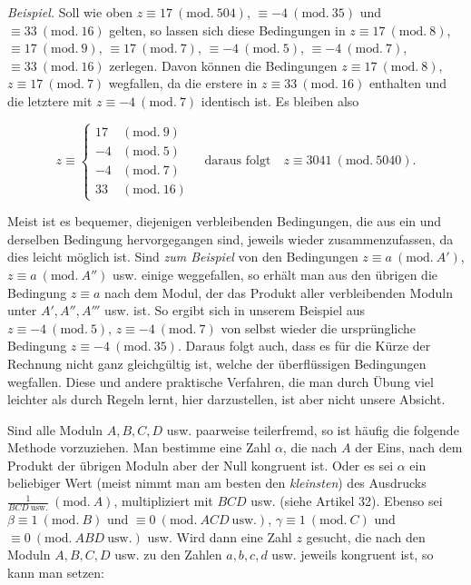 
\emph{Beispiel.} Soll wie oben $z\equiv 17\ (\mathrm{mod.}\ 504)$, $\equiv -4\ (\mathrm{mod.}\ 35)$ und $\equiv 33\ (\mathrm{mod.}\ 16)$ gelten, so lassen sich diese Bedingungen in $z\equiv 17\ (\mathrm{mod.}\ 8)$, $\equiv 17\ (\mathrm{mod.}\ 9)$, $\equiv 17\ (\mathrm{mod.}\ 7)$, $\equiv -4\ (\mathrm{mod.}\ 5)$, $\equiv -4\ (\mathrm{mod.}\ 7)$, $\equiv 33\ (\mathrm{mod.}\ 16)$ zerlegen. Davon können die Bedingungen $z\equiv 17\ (\mathrm{mod.}\ 8)$, $z\equiv 17\ (\mathrm{mod.}\ 7)$ wegfallen, da die erstere in $z\equiv 33\ (\mathrm{mod.}\ 16)$ enthalten und die letztere mit $z\equiv -4\ (\mathrm{mod.}\ 7)$ identisch ist. Es bleiben also

\[
z\equiv\left\{\begin{array}{rl}
17 & (\mathrm{mod.}\ 9)\\
-4 & (\mathrm{mod.}\ 5)\\
-4 & (\mathrm{mod.}\ 7)\\
33 & (\mathrm{mod.}\ 16)
\end{array}\right.
\quad\text{daraus folgt}\quad z\equiv 3041\ (\mathrm{mod.}\ 5040).
\]

Meist ist es bequemer, diejenigen verbleibenden Bedingungen, die aus ein und derselben Bedingung hervorgegangen sind, jeweils wieder zusammenzufassen, da dies leicht möglich ist. Sind \emph{zum Beispiel} von den Bedingungen $z\equiv a\ (\mathrm{mod.}\ A')$, $z\equiv a\ (\mathrm{mod.}\ A'')$ usw. einige weggefallen, so erhält man aus den übrigen die Bedingung $z\equiv a$ nach dem Modul, der das Produkt aller verbleibenden Moduln unter $A',A'',A'''$ usw. ist. So ergibt sich in unserem Beispiel aus $z\equiv -4\ (\mathrm{mod.}\ 5)$, $z\equiv -4\ (\mathrm{mod.}\ 7)$ von selbst wieder die ursprüngliche Bedingung $z\equiv -4\ (\mathrm{mod.}\ 35)$. Daraus folgt auch, dass es für die Kürze der Rechnung nicht ganz gleichgültig ist, welche der überflüssigen Bedingungen wegfallen. Diese und andere praktische Verfahren, die man durch Übung viel leichter als durch Regeln lernt, hier darzustellen, ist aber nicht unsere Absicht.


Sind alle Moduln $A,B,C,D$ usw. paarweise teilerfremd, so ist häufig die folgende Methode vorzuziehen. Man bestimme eine Zahl $\alpha$, die nach $A$ der Eins, nach dem Produkt der übrigen Moduln aber der Null kongruent ist. Oder es sei $\alpha$ ein beliebiger Wert (meist nimmt man am besten den \emph{kleinsten}) des Ausdrucks $\frac{1}{BCD\ \mathrm{usw.}}\ (\mathrm{mod.}\ A)$, multipliziert mit $BCD$ usw. (siehe Artikel 32). Ebenso sei $\beta\equiv 1\ (\mathrm{mod.}\ B)$ und $\equiv 0\ (\mathrm{mod.}\ ACD\ \mathrm{usw.})$, $\gamma\equiv 1\ (\mathrm{mod.}\ C)$ und $\equiv 0\ (\mathrm{mod.}\ ABD\ \mathrm{usw.})$ usw. Wird dann eine Zahl $z$ gesucht, die nach den Moduln $A,B,C,D$ usw. zu den Zahlen $a,b,c,d$ usw. jeweils kongruent ist, so kann man setzen:

